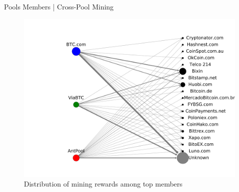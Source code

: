 \documentclass[10pt]{beamer}
\begin{document}
\begin{frame}[fragile]{Pools Members | Cross-Pool Mining}
    \begin{figure}
        \includegraphics[width=0.8\columnwidth]{images/payments_graph_400.pdf}
        \\Distribution of mining rewards among top members
    \end{figure}
\end{frame}
\end{document}

